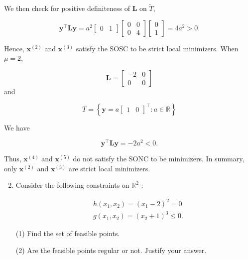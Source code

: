 We then check for positive definiteness of \(\boldsymbol{L}\) on \(\tilde{T}\),

\[
	\boldsymbol{y}^{\top} \boldsymbol{L} \boldsymbol{y}=a^{2}\left[\begin{array}{ll}
		0 & 1
	\end{array}\right]\left[\begin{array}{ll}
		0 & 0 \\
		0 & 4
	\end{array}\right]\left[\begin{array}{l}
		0 \\
		1
	\end{array}\right]=4 a^{2}>0 .
\]

Hence, \(\boldsymbol{x}^{(2)}\) and \(\boldsymbol{x}^{(3)}\) satisfy the SOSC to be strict local minimizers. When \(\mu=2\),

\[
	\boldsymbol{L}=\left[\begin{array}{cc}
		-2 & 0 \\
		0 & 0
	\end{array}\right]
\]
and

\[
	T=\left\{\boldsymbol{y}=a\left[\begin{array}{ll}
		1 & 0
	\end{array}\right]^{\top}: a \in \mathbb{R}\right\}
\]

We have

\[
	\boldsymbol{y}^{\top} \boldsymbol{L} \boldsymbol{y}=-2 a^{2}<0 .
\]

Thus, \(\boldsymbol{x}^{(4)}\) and \(\boldsymbol{x}^{(5)}\) do not satisfy the SONC to be minimizers. In summary, only \(\boldsymbol{x}^{(2)}\) and \(\boldsymbol{x}^{(3)}\) are strict local minimizers.

\begin{enumerate}
	\setcounter{enumi}{1}
	\item Consider the following constraints on \(\mathbb{R}^{2}\) :

	\[
		\begin{aligned}
			& h\left(x_{1}, x_{2}\right)=\left(x_{1}-2\right)^{2}=0 \\
			& g\left(x_{1}, x_{2}\right)=\left(x_{2}+1\right)^{3} \leq 0 .
		\end{aligned}
	\]
	
	(1) Find the set of feasible points.
	
	(2) Are the feasible points regular or not. Justify your answer.

\end{enumerate}

